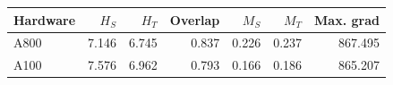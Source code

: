 \begin{tabular}{@{}lrrrrrr@{}}
\toprule
Hardware & $H_S$ & $H_T$ & Overlap & $M_S$ & $M_T$ & Max. grad \\
\midrule
A800 & 7.146 & 6.745 & 0.837 & 0.226 & 0.237 & 867.495 \\
A100 & 7.576 & 6.962 & 0.793 & 0.166 & 0.186 & 865.207 \\
\bottomrule\end{tabular}
